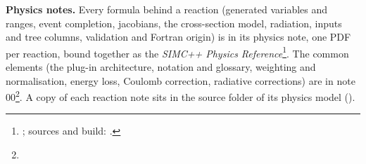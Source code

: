 \textbf{Physics notes.} Every formula behind a reaction (generated variables and ranges, event completion, jacobians,
the cross-section model, radiation, inputs and tree columns, validation and Fortran origin) is in its physics note, one
PDF per reaction, bound together as the \emph{SIMC++ Physics Reference}\footnote{; sources and build: .}.
The common elements (the plug-in architecture, notation and glossary, weighting and normalisation, energy loss, Coulomb
correction, radiative corrections) are in note 00\footnote{}. A
copy of each reaction note sits in the source folder of its physics model ().

